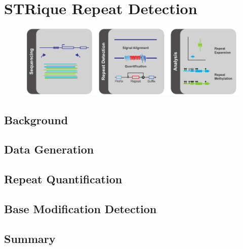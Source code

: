 \chapter{STRique Repeat Detection}
\label{sec:strique}

\begin{figure}[h]
    \centering
    \includegraphics[width=1.0\textwidth]{figures/strique/GA.pdf}
    \label{fig:strique:ga}
\end{figure}


\section{Background}
\label{sec:strique:background}

\section{Data Generation}
\label{sec:strique:data}

\section{Repeat Quantification}
\label{sec:strique:quantification}

\section{Base Modification Detection}
\label{sec:strique:modifications}

\section{Summary}
\label{sec:strique:summary}
